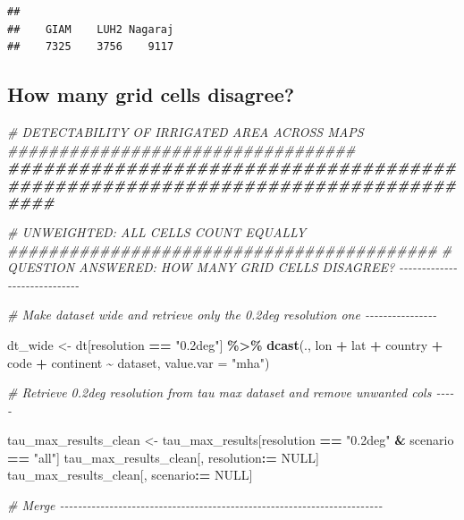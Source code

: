 \documentclass[
  11pt,
]{article}
\newenvironment{Shaded}{\begin{snugshade}}{\end{snugshade}}
\newcommand{\AttributeTok}[1]{\textcolor[rgb]{0.13,0.29,0.53}{#1}}
\newcommand{\CommentTok}[1]{\textcolor[rgb]{0.56,0.35,0.01}{\textit{#1}}}
\newcommand{\ConstantTok}[1]{\textcolor[rgb]{0.56,0.35,0.01}{#1}}
\newcommand{\DocumentationTok}[1]{\textcolor[rgb]{0.56,0.35,0.01}{\textbf{\textit{#1}}}}
\newcommand{\FunctionTok}[1]{\textcolor[rgb]{0.13,0.29,0.53}{\textbf{#1}}}
\newcommand{\NormalTok}[1]{#1}
\newcommand{\OtherTok}[1]{\textcolor[rgb]{0.56,0.35,0.01}{#1}}
\newcommand{\SpecialCharTok}[1]{\textcolor[rgb]{0.81,0.36,0.00}{\textbf{#1}}}
\newcommand{\StringTok}[1]{\textcolor[rgb]{0.31,0.60,0.02}{#1}}
\begin{document}
\begin{verbatim}
## 
##    GIAM    LUH2 Nagaraj 
##    7325    3756    9117
\end{verbatim}

\subsection{How many grid cells
disagree?}\label{how-many-grid-cells-disagree}

\begin{Shaded}
\begin{Highlighting}[]
\CommentTok{\# DETECTABILITY OF IRRIGATED AREA ACROSS MAPS \#\#\#\#\#\#\#\#\#\#\#\#\#\#\#\#\#\#\#\#\#\#\#\#\#\#\#\#\#\#\#\#\#\#}
\DocumentationTok{\#\#\#\#\#\#\#\#\#\#\#\#\#\#\#\#\#\#\#\#\#\#\#\#\#\#\#\#\#\#\#\#\#\#\#\#\#\#\#\#\#\#\#\#\#\#\#\#\#\#\#\#\#\#\#\#\#\#\#\#\#\#\#\#\#\#\#\#\#\#\#\#\#\#\#\#\#\#\#\#}

\CommentTok{\# UNWEIGHTED: ALL CELLS COUNT EQUALLY \#\#\#\#\#\#\#\#\#\#\#\#\#\#\#\#\#\#\#\#\#\#\#\#\#\#\#\#\#\#\#\#\#\#\#\#\#\#\#\#\#\#}
\CommentTok{\# QUESTION ANSWERED: HOW MANY GRID CELLS DISAGREE? {-}{-}{-}{-}{-}{-}{-}{-}{-}{-}{-}{-}{-}{-}{-}{-}{-}{-}{-}{-}{-}{-}{-}{-}{-}{-}{-}{-}{-}}

\CommentTok{\# Make dataset wide and retrieve only the 0.2deg resolution one {-}{-}{-}{-}{-}{-}{-}{-}{-}{-}{-}{-}{-}{-}{-}{-}}

\NormalTok{dt\_wide }\OtherTok{\textless{}{-}}\NormalTok{ dt[resolution }\SpecialCharTok{==} \StringTok{"0.2deg"}\NormalTok{] }\SpecialCharTok{\%\textgreater{}\%}
  \FunctionTok{dcast}\NormalTok{(., lon }\SpecialCharTok{+}\NormalTok{ lat }\SpecialCharTok{+}\NormalTok{ country }\SpecialCharTok{+}\NormalTok{ code }\SpecialCharTok{+}\NormalTok{ continent }\SpecialCharTok{\textasciitilde{}}\NormalTok{ dataset, }\AttributeTok{value.var =} \StringTok{"mha"}\NormalTok{)}

\CommentTok{\# Retrieve 0.2deg resolution from tau max dataset and remove unwanted cols {-}{-}{-}{-}{-}}

\NormalTok{tau\_max\_results\_clean }\OtherTok{\textless{}{-}}\NormalTok{ tau\_max\_results[resolution }\SpecialCharTok{==} \StringTok{"0.2deg"} \SpecialCharTok{\&}\NormalTok{ scenario }\SpecialCharTok{==} \StringTok{"all"}\NormalTok{]}
\NormalTok{tau\_max\_results\_clean[, resolution}\SpecialCharTok{:=} \ConstantTok{NULL}\NormalTok{]}
\NormalTok{tau\_max\_results\_clean[, scenario}\SpecialCharTok{:=} \ConstantTok{NULL}\NormalTok{]}

\CommentTok{\# Merge {-}{-}{-}{-}{-}{-}{-}{-}{-}{-}{-}{-}{-}{-}{-}{-}{-}{-}{-}{-}{-}{-}{-}{-}{-}{-}{-}{-}{-}{-}{-}{-}{-}{-}{-}{-}{-}{-}{-}{-}{-}{-}{-}{-}{-}{-}{-}{-}{-}{-}{-}{-}{-}{-}{-}{-}{-}{-}{-}{-}{-}{-}{-}{-}{-}{-}{-}{-}{-}{-}{-}{-}}


\end{Highlighting}
\end{Shaded}
\end{document}
